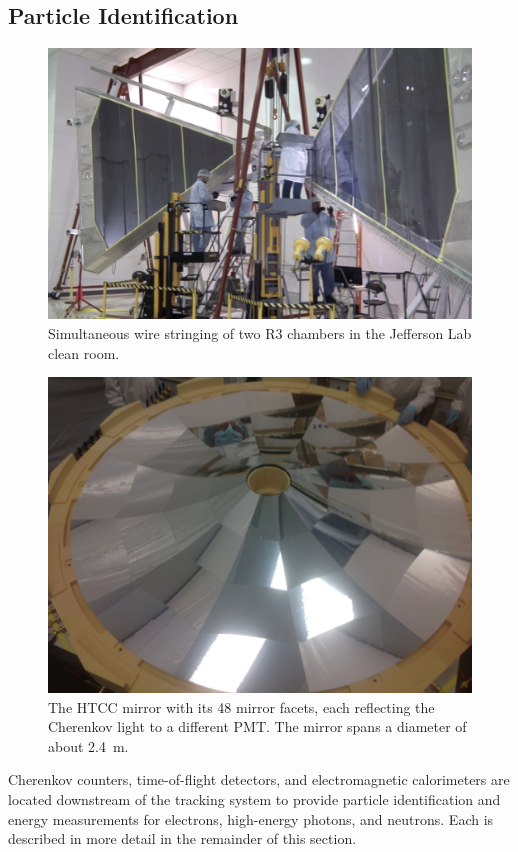 \documentclass[final,3p]{elsarticle}
\begin{document}
\begin{twocolumn}
\subsection{Particle Identification}
\begin{figure}[htbp!]
\centerline{\includegraphics[width=1.65\columnwidth]{DC-R3.png}}
\caption{Simultaneous wire stringing of two R3 chambers in the Jefferson Lab clean room.}
\label{dc-stringing}
\end{figure}
\begin{figure}[ht!]
\centerline{\includegraphics[angle=90,width=0.75\columnwidth]{HTCC-mirror.png}}
\caption{The HTCC mirror with its 48 mirror facets, each reflecting the Cherenkov light to a different PMT. The
  mirror spans a diameter of about 2.4~m.}
\label{htcc}
\end{figure}
Cherenkov counters, time-of-flight detectors, and electromagnetic calorimeters are located downstream of the
tracking system to provide particle identification and energy measurements for electrons, high-energy photons,
and neutrons.  Each is described in more detail in the remainder of this section.


\end{twocolumn}
\end{document}
